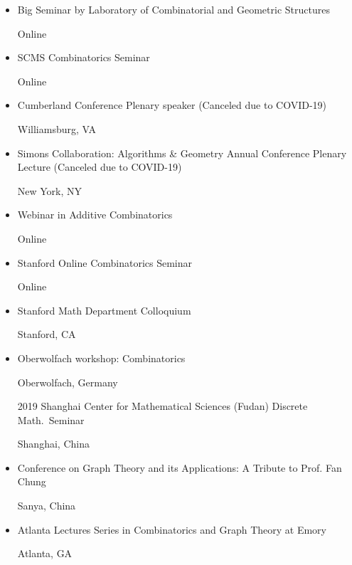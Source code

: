 \documentclass[11pt]{amsart}
\newcommand{\rightloc}[1]{\hfill {\raggedright #1}}
\begin{document}
\begin{itemize}[leftmargin=.4in,itemsep=5pt,topsep=0pt,label={}]
\item Big Seminar by Laboratory of Combinatorial and Geometric Structures \rightloc{Online}

\item SCMS Combinatorics Seminar \rightloc{Online}

\item Cumberland Conference Plenary speaker (Canceled due to COVID-19)
\rightloc{Williamsburg, VA}


\item Simons Collaboration: Algorithms \& Geometry Annual Conference Plenary Lecture (Canceled due to COVID-19) \rightloc{New York, NY}


\item Webinar in Additive Combinatorics \rightloc{Online}

\item Stanford Online Combinatorics Seminar \rightloc{Online}


\item Stanford Math Department Colloquium \rightloc{Stanford, CA}

\item Oberwolfach workshop: Combinatorics
\rightloc{Oberwolfach, Germany}

\item[2019] Shanghai Center for Mathematical Sciences (Fudan) Discrete Math.\ Seminar
\rightloc{Shanghai, China}


\item Conference on Graph Theory and its Applications: A Tribute to Prof. Fan Chung
\rightloc{Sanya, China}

\item Atlanta Lectures Series in Combinatorics and Graph Theory at Emory
\rightloc{Atlanta, GA}


\end{itemize}
\end{document}
